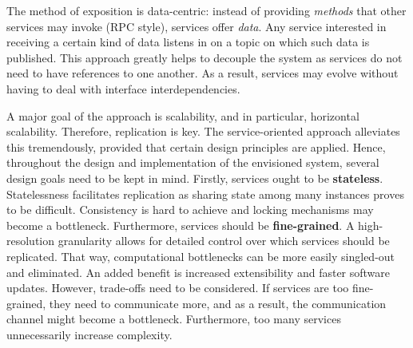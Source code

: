 
The method of exposition is data-centric: instead of providing \emph{methods} that other services may invoke (RPC style), services offer \emph{data}. Any service interested in receiving a certain kind of data listens in on a topic on which such data is published. This approach greatly helps to decouple the system as services do not need to have references to one another. As a result, services may evolve without having to deal with interface interdependencies.


A major goal of the approach is scalability, and in particular, horizontal scalability. Therefore, replication is key. The service-oriented approach alleviates this tremendously, provided that certain design principles are applied. Hence, throughout the design and implementation of the envisioned system, several design goals need to be kept in mind. Firstly, services ought to be \textbf{stateless}. Statelessness facilitates replication as sharing state among many instances proves to be difficult. Consistency is hard to achieve and locking mechanisms may become a bottleneck. Furthermore, services should be \textbf{fine-grained}. A high-resolution granularity allows for detailed control over which services should be replicated. That way, computational bottlenecks can be more easily singled-out and eliminated. An added benefit is increased extensibility and faster software updates. However, trade-offs need to be considered. If services are too fine-grained, they need to communicate more, and as a result, the communication channel might become a bottleneck. Furthermore, too many services unnecessarily increase complexity.

